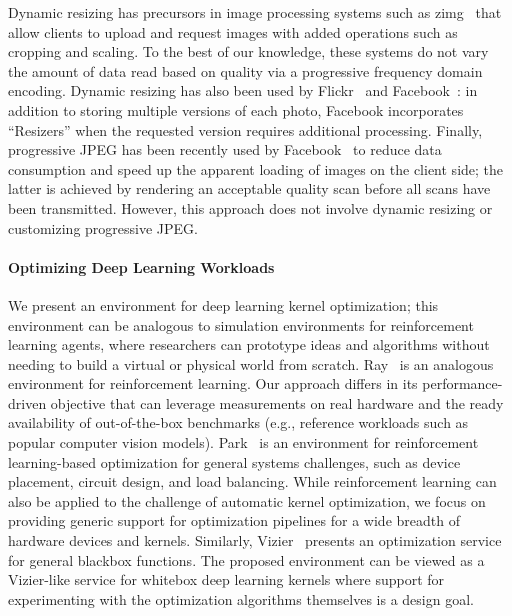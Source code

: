 Dynamic resizing has precursors in image processing systems such as zimg~\cite{zimg} that allow clients to upload and request images with added operations such as cropping and scaling. 
To the best of our knowledge, these systems do not vary the amount of data read based on quality via a progressive frequency domain encoding.
Dynamic resizing has also been used by Flickr~\cite{flickr} and Facebook~\cite{huang2013analysis}: in addition to storing multiple versions of each photo, Facebook incorporates ``Resizers'' when the requested version requires additional processing.
Finally, progressive JPEG has been recently used by Facebook~\cite{fasterfacebook} to reduce data consumption and speed up the apparent loading of images on the client side; the latter is achieved by rendering an acceptable quality scan before all scans have been transmitted. However, this approach does not involve dynamic resizing or customizing progressive JPEG\@.

\paragraph{Optimizing Deep Learning Workloads}
We present an environment for deep learning kernel optimization; this environment can be analogous to simulation environments for reinforcement learning agents, where researchers can prototype ideas and algorithms without needing to build a virtual or physical world from scratch.
Ray~\cite{222605} is an analogous environment for reinforcement learning.
Our approach differs in its performance-driven objective that can leverage measurements on real hardware and the ready availability of out-of-the-box benchmarks (e.g., reference workloads such as popular computer vision models).
Park~\cite{mao2019park} is an environment for reinforcement learning-based optimization for general systems challenges, such as device placement, circuit design, and load balancing.
While reinforcement learning can also be applied to the challenge of automatic kernel optimization, we focus on providing generic support for optimization pipelines for a wide breadth of hardware devices and kernels.
Similarly, Vizier~\cite{golovin2017google} presents an optimization service for general blackbox functions.
The proposed environment can be viewed as a Vizier-like service for whitebox deep learning kernels where support for experimenting with the optimization algorithms themselves is a design goal.


